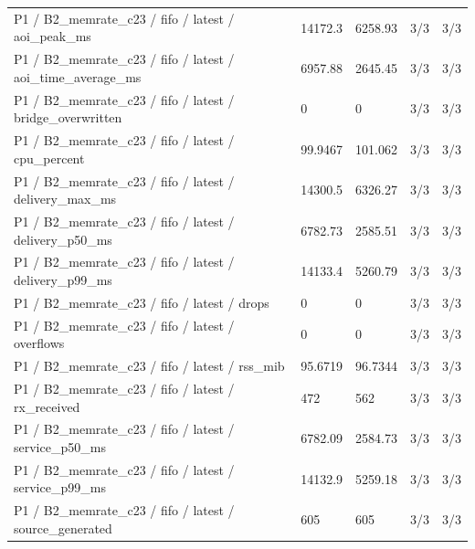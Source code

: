 \begin{tabular}{@{}lllll@{}}
P1 / B2\_memrate\_c23 / fifo / latest / aoi\_peak\_ms & 14172.3 & 6258.93 & 3/3 & 3/3 \\
P1 / B2\_memrate\_c23 / fifo / latest / aoi\_time\_average\_ms & 6957.88 & 2645.45 & 3/3 & 3/3 \\
P1 / B2\_memrate\_c23 / fifo / latest / bridge\_overwritten & 0 & 0 & 3/3 & 3/3 \\
P1 / B2\_memrate\_c23 / fifo / latest / cpu\_percent & 99.9467 & 101.062 & 3/3 & 3/3 \\
P1 / B2\_memrate\_c23 / fifo / latest / delivery\_max\_ms & 14300.5 & 6326.27 & 3/3 & 3/3 \\
P1 / B2\_memrate\_c23 / fifo / latest / delivery\_p50\_ms & 6782.73 & 2585.51 & 3/3 & 3/3 \\
P1 / B2\_memrate\_c23 / fifo / latest / delivery\_p99\_ms & 14133.4 & 5260.79 & 3/3 & 3/3 \\
P1 / B2\_memrate\_c23 / fifo / latest / drops & 0 & 0 & 3/3 & 3/3 \\
P1 / B2\_memrate\_c23 / fifo / latest / overflows & 0 & 0 & 3/3 & 3/3 \\
P1 / B2\_memrate\_c23 / fifo / latest / rss\_mib & 95.6719 & 96.7344 & 3/3 & 3/3 \\
P1 / B2\_memrate\_c23 / fifo / latest / rx\_received & 472 & 562 & 3/3 & 3/3 \\
P1 / B2\_memrate\_c23 / fifo / latest / service\_p50\_ms & 6782.09 & 2584.73 & 3/3 & 3/3 \\
P1 / B2\_memrate\_c23 / fifo / latest / service\_p99\_ms & 14132.9 & 5259.18 & 3/3 & 3/3 \\
P1 / B2\_memrate\_c23 / fifo / latest / source\_generated & 605 & 605 & 3/3 & 3/3 \\
\bottomrule
\end{tabular}


